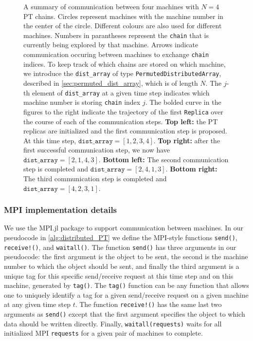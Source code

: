 \begin{figure}[t]
\begin{minipage}{0.48\textwidth}
  \end{minipage}
  \caption{
    A summary of communication between four machines with $N=4$ PT chains.
    Circles represent machines with the machine number in the center of the circle. 
    Different colours are also used for different machines.
    Numbers in parantheses represent the \texttt{chain} 
    that is currently being explored by that machine. 
    Arrows indicate communication occuring between machines to exchange \texttt{chain} 
    indices.
    To keep track of which chains are stored on which machine, we introduce the 
    \texttt{dist\_array} of type \texttt{PermutedDistributedArray}, described in 
    \cref{sec:permuted_dist_array}, which is of length $N$. 
    The $j$-th element of \texttt{dist\_array} at a given time step indicates which 
    machine number is storing \texttt{chain} index $j$.
    The bolded curve in the figures to the right indicate the trajectory of the first 
    \texttt{Replica} over the course of each of the communication steps.      
    \textbf{Top left:} the PT replicas are initialized and the first communication step 
    is proposed. At this time step, $\texttt{dist\_array} = [1,2,3,4]$.
    \textbf{Top right:} after the first successful communication step, we now have 
    $\texttt{dist\_array} = [2,1,4,3]$.
    \textbf{Bottom left:} The second communication step is completed and 
    $\texttt{dist\_array} = [2,4,1,3]$.
    \textbf{Bottom right:} The third communication step is completed and 
    $\texttt{dist\_array} = [4,2,3,1]$.}
  \label{fig:index_process}
\end{figure}

\subsubsection{MPI implementation details}
We use the MPI.jl \cite{byrne2021mpi} package to support communication between machines. 
In our pseudocode in \cref{alg:distributed_PT} we define the MPI-style 
functions \texttt{send()}, \texttt{receive!()}, 
and \texttt{waitall()}. 
The function \texttt{send()} has three arguments in our pseudocode: the first argument 
is the object to be sent, the second is the machine number to which the object should 
be sent, and finally the third argument is a unique tag for this specific send/receive 
request at this time step and on this machine, generated by \texttt{tag()}.
The \texttt{tag()} function can be any function that allows one to uniquely identify 
a tag for a given send/receive request on a given machine at any given time step $t$.
The function \texttt{receive!()} has the same last two arguments as \texttt{send()} 
except that the first argument 
specifies the object to which data should be written directly. Finally, 
\texttt{waitall(requests)} waits for all initialized MPI \texttt{requests} for a given pair 
of machines to complete.

